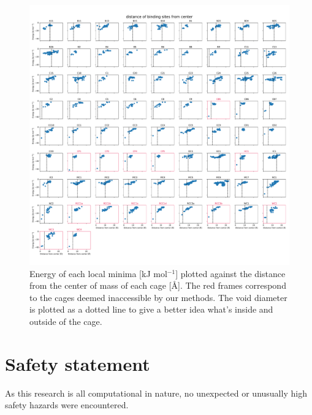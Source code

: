 \documentclass[journal=jacsat,manuscript=article]{achemso}
\begin{document}
\begin{figure}
\centering
	\includegraphics[width=\columnwidth]{../distance_of_binding_sites.pdf}
	\caption{{\color{red}Energy of each local minima [kJ mol$^{-1}$] plotted against the distance from the center of mass of each cage [\AA]. The red frames correspond to the cages deemed inaccessible by our methods. The void diameter is plotted as a dotted line to give a better idea what's inside and outside of the cage.}
	} \label{fig:energy_vs_dist}
\end{figure}


\clearpage

\section{Safety statement}
As this research is all computational in nature, no unexpected or unusually high safety hazards were encountered.

\clearpage


\end{document}
